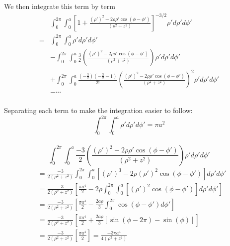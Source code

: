 \documentclass{article}
\begin{document}
We then integrate this term by term 
\begin{align*} 
&\int_{0}^{2\pi}\int_{0}^{a} \left[1 + \frac{(\rho')^{2} - 2\rho\rho'\cos(\phi-\phi')}{(\rho^{2} + z^{2})}\right]^{-3/2} \rho' d\rho'd\phi'\\
=& \int_{0}^{2\pi}\int_{0}^{a} \rho' d\rho'd\phi'\\
&- \int_{0}^{2\pi}\int_{0}^{a} \frac{3}{2}\left( \frac{(\rho')^{2} - 2\rho\rho'\cos(\phi-\phi')}{(\rho^{2} + z^{2})} \right) \rho' d\rho'd\phi'\\
&+ \int_{0}^{2\pi}\int_{0}^{a} \frac{(-\frac{3}{2})(-\frac{3}{2}-1)}{2!}\left( \frac{(\rho')^{2} - 2\rho\rho'\cos(\phi-\phi')}{(\rho^{2} + z^{2})} \right)^{2} \rho' d\rho'd\phi'\\
&- \cdots\\
\end{align*}

Separating each term to make the integration easier to follow:
\[ \int_{0}^{2\pi}\int_{0}^{a} \rho' d\rho'd\phi' = \boxed{\pi a^{2}} \]
\\
\[ \int_{0}^{2\pi}\int_{0}^{a} \frac{-3}{2}\left( \frac{(\rho')^{2} - 2\rho\rho'\cos(\phi-\phi')}{(\rho^{2} + z^{2})} \right) \rho' d\rho'd\phi' \]
\begin{align*} 
&= \frac{-3}{2(\rho^{2} + z^{2})} \int_{0}^{2\pi}\int_{0}^{a} \left[ (\rho')^{3} - 2\rho(\rho')^{2}\cos(\phi-\phi') \right] d\rho'd\phi'\\
&= \frac{-3}{2(\rho^{2} + z^{2})} \left[ \frac{\pi a^{4}}{2} - 2\rho \int_{0}^{2\pi}\int_{0}^{a} \left[ (\rho')^{2}\cos(\phi-\phi') \right] d\rho'd\phi' \right]\\
&= \frac{-3}{2(\rho^{2} + z^{2})} \left[ \frac{\pi a^{4}}{2} - \frac{2a\rho}{3} \int_{0}^{2\pi} \cos(\phi-\phi') d\phi' \right]\\
&= \frac{-3}{2(\rho^{2} + z^{2})} \left[ \frac{\pi a^{4}}{2} + \frac{2a\rho}{3} \left[ \sin(\phi-2\pi) - \sin(\phi) \right] \right]\\
&= \frac{-3}{2(\rho^{2} + z^{2})} \left[ \frac{\pi a^{4}}{2} \right] = \boxed{\frac{-3\pi a^{4}}{4(\rho^{2} + z^{2})}}\\
\end{align*}
\end{document}
